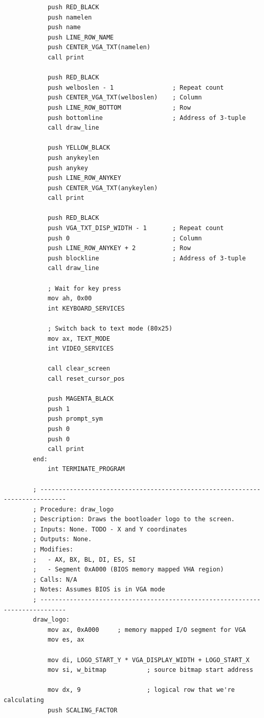 \documentclass{article}
\begin{document}
\begin{lstlisting}
            push RED_BLACK
            push namelen
            push name
            push LINE_ROW_NAME
            push CENTER_VGA_TXT(namelen)
            call print

            push RED_BLACK
            push welboslen - 1                ; Repeat count
            push CENTER_VGA_TXT(welboslen)    ; Column
            push LINE_ROW_BOTTOM              ; Row
            push bottomline                   ; Address of 3-tuple
            call draw_line

            push YELLOW_BLACK
            push anykeylen
            push anykey
            push LINE_ROW_ANYKEY
            push CENTER_VGA_TXT(anykeylen)
            call print

            push RED_BLACK
            push VGA_TXT_DISP_WIDTH - 1       ; Repeat count
            push 0                            ; Column
            push LINE_ROW_ANYKEY + 2          ; Row
            push blockline                    ; Address of 3-tuple
            call draw_line

            ; Wait for key press
            mov ah, 0x00
            int KEYBOARD_SERVICES

            ; Switch back to text mode (80x25)
            mov ax, TEXT_MODE
            int VIDEO_SERVICES

            call clear_screen
            call reset_cursor_pos

            push MAGENTA_BLACK
            push 1
            push prompt_sym
            push 0
            push 0
            call print
        end:
            int TERMINATE_PROGRAM

        ; -----------------------------------------------------------------------------
        ; Procedure: draw_logo
        ; Description: Draws the bootloader logo to the screen.
        ; Inputs: None. TODO - X and Y coordinates
        ; Outputs: None.
        ; Modifies:
        ;   - AX, BX, BL, DI, ES, SI
        ;   - Segment 0xA000 (BIOS memory mapped VHA region)
        ; Calls: N/A
        ; Notes: Assumes BIOS is in VGA mode
        ; -----------------------------------------------------------------------------
        draw_logo:
            mov ax, 0xA000     ; memory mapped I/O segment for VGA
            mov es, ax

            mov di, LOGO_START_Y * VGA_DISPLAY_WIDTH + LOGO_START_X
            mov si, w_bitmap           ; source bitmap start address

            mov dx, 9                  ; logical row that we're calculating
            push SCALING_FACTOR


\end{lstlisting}
\end{document}
